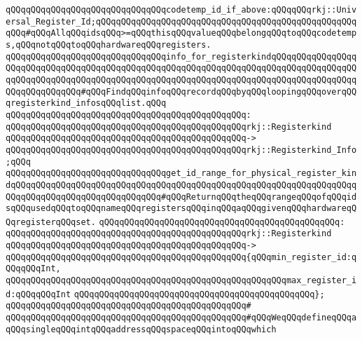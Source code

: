 \newline
\verb|qQQqqQQqqQQqqQQqqQQqqQQqqQQqqQQqcodetemp_id_if_above:qQQqqQQqrkj::Universal_Register_Id;qQQqqQQqqQQqqQQqqQQqqQQqqQQqqQQqqQQqqQQqqQQqqQQqqQQqqQQq#qQQqAllqQQqidsqQQq>=qQQqthisqQQqvalueqQQqbelongqQQqtoqQQqcodetemps,qQQqnotqQQqtoqQQqhardwareqQQqregisters.|\newline
\newline
\newline
\verb|qQQqqQQqqQQqqQQqqQQqqQQqqQQqqQQqinfo_for_registerkindqQQqqQQqqQQqqQQqqQQqqQQqqQQqqQQqqQQqqQQqqQQqqQQqqQQqqQQqqQQqqQQqqQQqqQQqqQQqqQQqqQQqqQQqqQQqqQQqqQQqqQQqqQQqqQQqqQQqqQQqqQQqqQQqqQQqqQQqqQQqqQQqqQQqqQQqqQQqqQQqqQQqqQQqqQQq#qQQqFindqQQqinfoqQQqrecordqQQqbyqQQqloopingqQQqoverqQQqregisterkind_infosqQQqlist.qQQq|\newline
\verb|qQQqqQQqqQQqqQQqqQQqqQQqqQQqqQQqqQQqqQQqqQQqqQQq:|\newline
\verb|qQQqqQQqqQQqqQQqqQQqqQQqqQQqqQQqqQQqqQQqqQQqqQQqrkj::Registerkind|\newline
\verb|qQQqqQQqqQQqqQQqqQQqqQQqqQQqqQQqqQQqqQQqqQQqqQQq->|\newline
\verb|qQQqqQQqqQQqqQQqqQQqqQQqqQQqqQQqqQQqqQQqqQQqqQQqrkj::Registerkind_Info;qQQq|\newline
\newline
\newline
\verb|qQQqqQQqqQQqqQQqqQQqqQQqqQQqqQQqget_id_range_for_physical_register_kindqQQqqQQqqQQqqQQqqQQqqQQqqQQqqQQqqQQqqQQqqQQqqQQqqQQqqQQqqQQqqQQqqQQqqQQqqQQqqQQqqQQqqQQqqQQqqQQqqQQq#qQQqReturnqQQqtheqQQqrangeqQQqofqQQqidsqQQqusedqQQqtoqQQqnameqQQqregistersqQQqinqQQqaqQQqgivenqQQqhardwareqQQqregisterqQQqset.|\newline
\verb|qQQqqQQqqQQqqQQqqQQqqQQqqQQqqQQqqQQqqQQqqQQqqQQq:|\newline
\verb|qQQqqQQqqQQqqQQqqQQqqQQqqQQqqQQqqQQqqQQqqQQqqQQqrkj::Registerkind|\newline
\verb|qQQqqQQqqQQqqQQqqQQqqQQqqQQqqQQqqQQqqQQqqQQqqQQq->|\newline
\verb|qQQqqQQqqQQqqQQqqQQqqQQqqQQqqQQqqQQqqQQqqQQqqQQq{qQQqmin_register_id:qQQqqQQqInt,|\newline
\verb|qQQqqQQqqQQqqQQqqQQqqQQqqQQqqQQqqQQqqQQqqQQqqQQqqQQqqQQqmax_register_id:qQQqqQQqInt|\newline
\verb|qQQqqQQqqQQqqQQqqQQqqQQqqQQqqQQqqQQqqQQqqQQqqQQq};|\newline
\verb|qQQqqQQqqQQqqQQqqQQqqQQqqQQqqQQqqQQqqQQqqQQqqQQq#|\newline
\verb|qQQqqQQqqQQqqQQqqQQqqQQqqQQqqQQqqQQqqQQqqQQqqQQq#qQQqWeqQQqdefineqQQqaqQQqsingleqQQqintqQQqaddressqQQqspaceqQQqintoqQQqwhich|\newline
